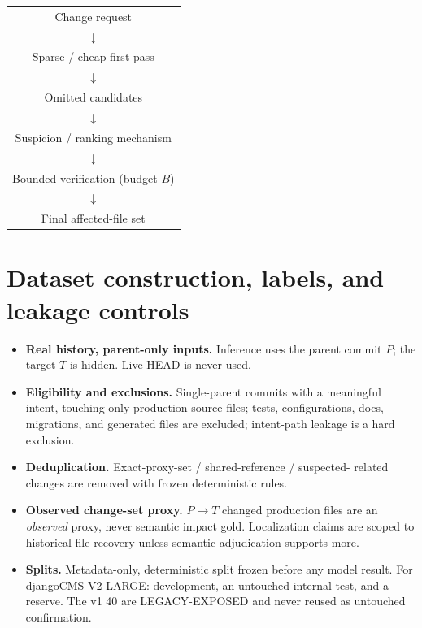 \documentclass[11pt,a4paper]{article}
\begin{document}
\begin{center}
\begin{tabular}{@{}c@{}}
\hline
Change request \\
$\downarrow$ \\
Sparse / cheap first pass \\
$\downarrow$ \\
Omitted candidates \\
$\downarrow$ \\
Suspicion / ranking mechanism \\
$\downarrow$ \\
Bounded verification (budget $B$) \\
$\downarrow$ \\
Final affected-file set \\
\hline
\end{tabular}
\end{center}

\section{Dataset construction, labels, and leakage controls}
\label{sec:dataset}

\begin{itemize}
  \item \textbf{Real history, parent-only inputs.} Inference uses the parent
        commit $P$; the target $T$ is hidden. Live HEAD is never used.
  \item \textbf{Eligibility and exclusions.} Single-parent commits with a
        meaningful intent, touching only production source files; tests,
        configurations, docs, migrations, and generated files are excluded;
        intent-path leakage is a hard exclusion.
  \item \textbf{Deduplication.} Exact-proxy-set / shared-reference / suspected-
        related changes are removed with frozen deterministic rules.
  \item \textbf{Observed change-set proxy.} $P\!\to\!T$ changed production
        files are an \emph{observed} proxy, never semantic impact gold.
        Localization claims are scoped to historical-file recovery unless
        semantic adjudication supports more.
  \item \textbf{Splits.} Metadata-only, deterministic split frozen before any
        model result. For djangoCMS V2-LARGE: development, an untouched
        internal test, and a reserve. The v1 40 are LEGACY-EXPOSED and never
        reused as untouched confirmation.
\end{itemize}
\end{document}
